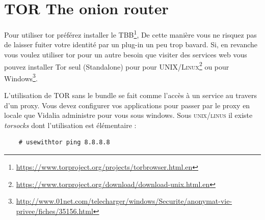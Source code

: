 \documentclass[a4paper]{article}
\begin{document}
\section{TOR The onion router}
Pour utiliser tor préférez installer le \textsc{TBB}\protect\footnote{\url{https://www.torproject.org/projects/torbrowser.html.en}},
De cette manière vous ne risquez pas de laisser fuiter votre identité par un plug-in un peu trop bavard.
Si, en revanche vous voulez utiliser tor pour un autre besoin que visiter des services web vous pouvez installer 
Tor seul (Standalone) pour pour \textsc{UNIX/Linux}\protect\footnote{\url{https://www.torproject.org/download/download-unix.html.en}}
ou pour Windows\protect\footnote{\url{http://www.01net.com/telecharger/windows/Securite/anonymat-vie-privee/fiches/35156.html}}.

L'utilisation de TOR sans le bundle se fait comme l'accès à un service au travers d'un proxy. Vous devez configurer vos applications
pour passer par le proxy en locale que Vidalia administre pour vous sous windows. Sous \textsc{unix/linus} il existe \emph{torsocks}
dont l'utilisation est élémentaire :

\begin{verbatim}
    # usewithtor ping 8.8.8.8
\end{verbatim}
\end{document}
